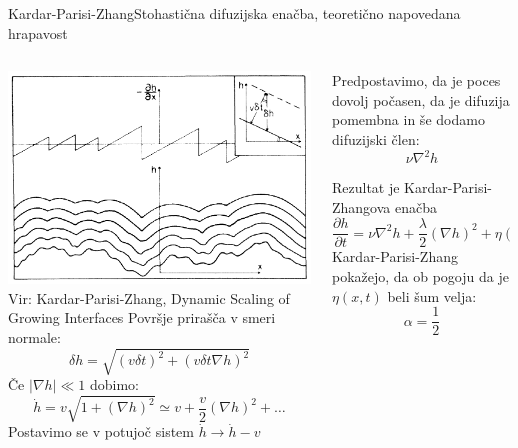 \documentclass{beamer}
\begin{document}
\begin{frame}{Kardar-Parisi-Zhang}{Stohastična difuzijska enačba, teoretično napovedana hrapavost}
\footnotesize
\begin{columns}
  \begin{column}{0.45\textwidth}
    \includegraphics[width=1\textwidth]{slike/kpz}
    \tiny{\\ Vir: Kardar-Parisi-Zhang, Dynamic Scaling of Growing Interfaces}
    \newline
    \newline
    Površje prirašča v smeri normale:
    \begin{equation} \delta h = \sqrt{ (v \delta t)^2 + (v \delta t \nabla h)^2} \end{equation}   
    Če $|\nabla h| \ll 1$ dobimo: 
    \begin{equation} \dot h = v \sqrt{1 + (\nabla h)^2} \simeq v + \frac{v}{2} (\nabla h)^2 + \ldots \end{equation}
    Postavimo se v potujoč sistem $\dot h \rightarrow \dot h - v$
    
  \end{column}
  \begin{column}{0.55\textwidth}
    Predpostavimo, da je poces dovolj počasen, da je difuzija pomembna in še dodamo difuzijski člen:
    \begin{equation} \nu \nabla^2 h \end{equation}
    \newline

    Rezultat je Kardar-Parisi-Zhangova enačba
    \begin{equation} \frac{\partial h}{\partial t} = \nu \nabla^2 h + \frac{\lambda}{2} (\nabla h)^2 + \eta (\mathbf{x},t) \end{equation}
    \newline
    Kardar-Parisi-Zhang pokažejo, da ob pogoju da je $\eta(x,t)$ beli šum velja:
    \begin{equation} \alpha = \frac{1}{2} \end{equation}
  \end{column}
\end{columns}

\end{frame}
\end{document}
